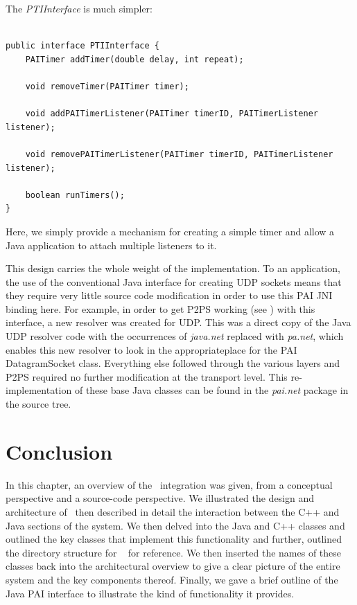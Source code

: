 The \emph{PTIInterface} is much simpler:

\footnotesize
\begin{verbatim}

public interface PTIInterface {
    PAITimer addTimer(double delay, int repeat);

    void removeTimer(PAITimer timer);

    void addPAITimerListener(PAITimer timerID, PAITimerListener listener);

    void removePAITimerListener(PAITimer timerID, PAITimerListener listener);

    boolean runTimers();
}

\end{verbatim}
\normalsize

Here, we simply provide a mechanism for creating a simple timer and
allow a Java application to attach multiple listeners to it.
 
This design carries the whole weight of the \agentj implementation.  
To an application, the use of the conventional Java interface for 
creating  UDP sockets means that they require very 
little source code modification in order to use this PAI JNI binding here.
For example, in order to get P2PS working (see \cite{p2psx}) with this 
interface, a new resolver was created for UDP. This was a direct copy 
of the Java UDP resolver code with the occurrences of \emph{java.net} 
replaced with \emph{pa.net}, which enables this new resolver to look in
the appropriateplace for the PAI DatagramSocket class. Everything else 
followed through the various layers and P2PS required no further 
modification at the transport level. This re-implementation of these base 
Java classes can be found in the \emph{pai.net} package in the source tree. 

\section{Conclusion}

In this chapter, an overview of the \agentj~integration was given, from
a conceptual perspective and a source-code perspective. We illustrated
the design and architecture of \agentj~then described in detail the
interaction between the C++ and Java sections of the system.  We then
delved into the Java and C++ classes and outlined the key classes
that implement this functionality and further, outlined the directory structure
for \agentj~ for reference.  We then inserted the names of these classes
back into the architectural overview to give a clear picture of the entire
system and the key components thereof.  Finally, we gave a brief
outline of the Java PAI interface to illustrate the kind of functionality it
provides.
  


